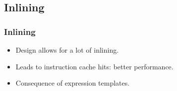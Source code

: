 \subsection{Inlining}
\frame{\tableofcontents[currentsubsection]}

\begin{frame}
\frametitle{Inlining}
\begin{itemize}
    
\item Design allows for a lot of inlining.
\item Leads to instruction cache hits: better performance.
\item Consequence of expression templates.

\end{itemize}
\end{frame}
